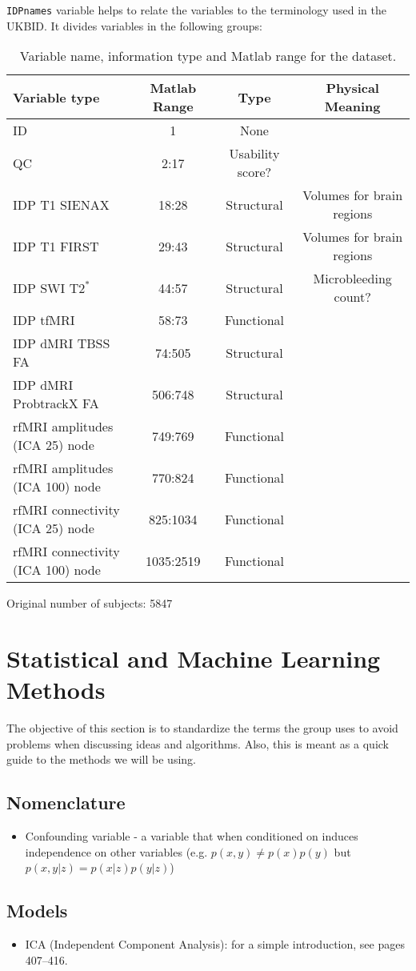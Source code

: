\documentclass{article}
\begin{document}
{\tt IDPnames} variable helps to relate the variables to the terminology used in the UKBID. It divides variables in the following groups:
\begin{table}
  \begin{tabular}{lccc}
    \toprule
    {\bf Variable type} & {\bf Matlab Range} & {\bf Type} &{\bf Physical Meaning}\\
    \midrule
    ID  & 1 & None \\
    QC  & 2:17 & Usability score?\\
    IDP T1 SIENAX & 18:28 & Structural & Volumes for brain regions\\
    IDP T1 FIRST & 29:43 & Structural & Volumes for brain regions\\
    IDP SWI $\text{T2}^{*}$ & 44:57 & Structural & Microbleeding count?\\
    IDP tfMRI & 58:73 & Functional & \\
    IDP dMRI TBSS FA & 74:505 & Structural & \\
    IDP dMRI ProbtrackX FA & 506:748 & Structural & \\
    rfMRI amplitudes (ICA 25) node    & 749:769 & Functional &\\
    rfMRI amplitudes (ICA 100) node   & 770:824 & Functional &\\
    rfMRI connectivity (ICA 25) node  & 825:1034 & Functional &\\
    rfMRI connectivity (ICA 100) node & 1035:2519 & Functional &\\
    \bottomrule
  \end{tabular}
  \caption{Variable name, information type and  Matlab range for the dataset.}
  \label{tab:data-ranges}
\end{table}
Original number of subjects: 5847

\section{Statistical and Machine Learning Methods\label{sec:methods}}

The objective of this section is to standardize the terms the group uses to avoid problems when discussing ideas and algorithms. Also, this is meant as a quick guide to the methods we will be using.

\subsection{Nomenclature\label{sec:method-nomen}}
\begin{itemize}
\item Confounding variable - a variable that when conditioned on induces independence on other variables (e.g. $p(x,y)\neq p(x)p(y)$ but $p(x,y|z) = p(x|z)p(y|z)$)
\end{itemize}


\subsection{Models\label{models}}
\begin{itemize}
\item ICA (Independent Component Analysis): for a simple introduction, see \cite{murphy2012} pages 407--416.
\end{itemize}



\end{document}
